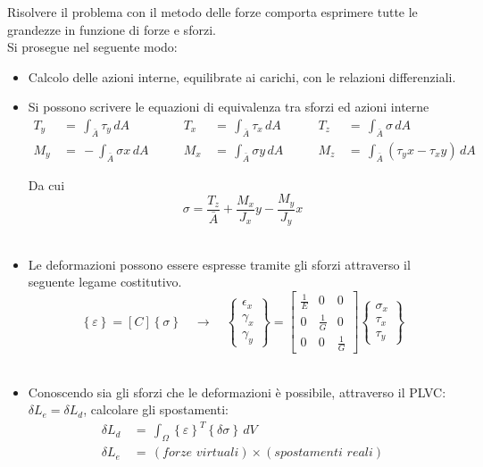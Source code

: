 Risolvere il problema con il metodo delle forze comporta esprimere tutte le grandezze in funzione di forze e sforzi.\\
Si prosegue nel seguente modo:
\begin{itemize}
    \item Calcolo delle azioni interne, equilibrate ai carichi, con le relazioni differenziali.\\
    \item Si possono scrivere le equazioni di equivalenza tra sforzi ed azioni interne
    \begin{align*}
    T_y \, &=\, \int_{\bar{A}} \tau_y \, dA 
    &\quad\quad T_x \, &=\, \int_{\bar{A}} \tau_x \, dA 
    &\quad\quad T_z \, &=\, \int_{\bar{A}} \sigma \, dA \\
    M_y \, &=\, - \int_{\bar{A}} \sigma x \, dA 
    &\quad\quad M_x \, &=\,  \int_{\bar{A}} \sigma y \, dA 
    &\quad\quad M_z \, &=\, \int_{\bar{A}} ( \tau_y x - \tau_x y ) \, dA
\end{align*}

    Da cui 
    \begin{equation*}
        \sigma = \frac{T_z}{\bar{A}} +  \frac{M_x}{J_x}y -\frac{M_y}{J_y}x
    \end{equation*}\\
    \item Le deformazioni possono essere espresse tramite gli sforzi attraverso il seguente legame costitutivo.
    \begin{equation*}
    \left\{\varepsilon\right\} = [C]  \left\{\sigma\right\}\quad \rightarrow \quad
\left\{
\begin{array}{c}
\epsilon_x \\
\gamma_x \\
\gamma_y
\end{array}
\right\}
=
\left[
\begin{array}{ccc}
\frac{1}{E} & 0 & 0 \\
0 & \frac{1}{G} & 0 \\
0 & 0 & \frac{1}{G}
\end{array}
\right]
\left\{
\begin{array}{c}
\sigma_x \\
\tau_x \\
\tau_y
\end{array}
\right\}
\end{equation*}\\
\item Conoscendo sia gli sforzi che le deformazioni è possibile, attraverso il PLVC: $\delta L_e = \delta L_d$, calcolare gli spostamenti:
\begin{align*}
    \delta L_d \, &= \, \int_{\Omega} \left\{\varepsilon \right\}^T \left\{\delta\sigma \right\} \, dV\\
    \delta L_e \, &= \, (forze \,\, virtuali)\times (spostamenti\,\,reali)
\end{align*}
\end{itemize}






